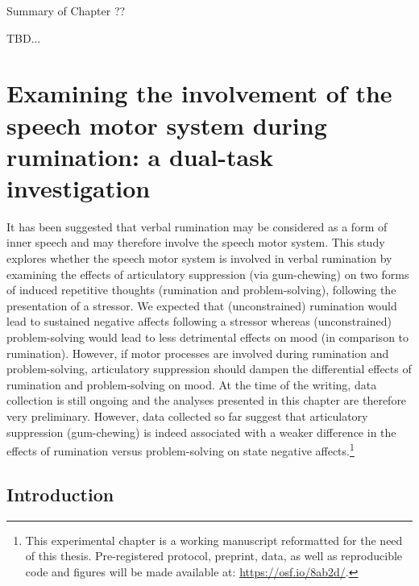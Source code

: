 \documentclass[a4paper,12pt,twoside,openright,oldfontcommands,final]{memoir}
\let\rmarkdownfootnote\footnote%
\def\footnote{\protect\rmarkdownfootnote}
\newcommand{\initial}[1]{
	\lettrine[lines=3,lhang=0.33,nindent=0em]{
		\color{gray}
     		{\textsc{#1}}}{}}
\newcommand\getcurrentref[1]{
 \ifnumequal{\value{#1}}{0}
  {??}
  {\the\value{#1}}
}
\begin{document}
\newpage

\begin{vplace}[1]

\begin{summary}{Summary of Chapter\getcurrentref{chapter}}

TBD...

\end{summary}

\end{vplace}

\hypertarget{chap7}{%
\chapter{Examining the involvement of the speech motor system during rumination: a dual-task investigation}\label{chap7}}

\initial{I}t has been suggested that verbal rumination may be considered as a form of inner speech and may therefore involve the speech motor system. This study explores whether the speech motor system is involved in verbal rumination by examining the effects of articulatory suppression (via gum-chewing) on two forms of induced repetitive thoughts (rumination and problem-solving), following the presentation of a stressor. We expected that (unconstrained) rumination would lead to sustained negative affects following a stressor whereas (unconstrained) problem-solving would lead to less detrimental effects on mood (in comparison to rumination). However, if motor processes are involved during rumination and problem-solving, articulatory suppression should dampen the differential effects of rumination and problem-solving on mood. At the time of the writing, data collection is still ongoing and the analyses presented in this chapter are therefore very preliminary. However, data collected so far suggest that articulatory suppression (gum-chewing) is indeed associated with a weaker difference in the effects of rumination versus problem-solving on state negative affects.\footnote{This experimental chapter is a working manuscript reformatted for the need of this thesis. Pre-registered protocol, preprint, data, as well as reproducible code and figures will be made available at: \url{https://osf.io/8ab2d/}.}

\hypertarget{introduction-4}{%
\section{Introduction}\label{introduction-4}}
\end{document}
